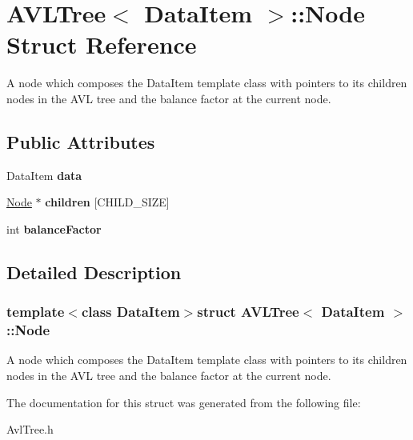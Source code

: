 \hypertarget{structAVLTree_1_1Node}{\section{A\-V\-L\-Tree$<$ Data\-Item $>$\-:\-:Node Struct Reference}
\label{structAVLTree_1_1Node}
}


A node which composes the Data\-Item template class with pointers to its children nodes in the A\-V\-L tree and the balance factor at the current node.  


\subsection*{Public Attributes}
\begin{DoxyCompactItemize}
\item 
\hypertarget{structAVLTree_1_1Node_a7be4bf3468896388ac4ca7927efa5309}{Data\-Item {\bfseries data}}\label{structAVLTree_1_1Node_a7be4bf3468896388ac4ca7927efa5309}

\item 
\hypertarget{structAVLTree_1_1Node_a8be0751ba22e265f286feb85488a6faa}{\hyperlink{structAVLTree_1_1Node}{Node} $\ast$ {\bfseries children} \mbox{[}C\-H\-I\-L\-D\-\_\-\-S\-I\-Z\-E\mbox{]}}\label{structAVLTree_1_1Node_a8be0751ba22e265f286feb85488a6faa}

\item 
\hypertarget{structAVLTree_1_1Node_a0ac3a6b042130f476df783d77c350915}{int {\bfseries balance\-Factor}}\label{structAVLTree_1_1Node_a0ac3a6b042130f476df783d77c350915}

\end{DoxyCompactItemize}


\subsection{Detailed Description}
\subsubsection*{template$<$class Data\-Item$>$struct A\-V\-L\-Tree$<$ Data\-Item $>$\-::\-Node}

A node which composes the Data\-Item template class with pointers to its children nodes in the A\-V\-L tree and the balance factor at the current node. 

The documentation for this struct was generated from the following file\-:\begin{DoxyCompactItemize}
\item 
Avl\-Tree.\-h\end{DoxyCompactItemize}
